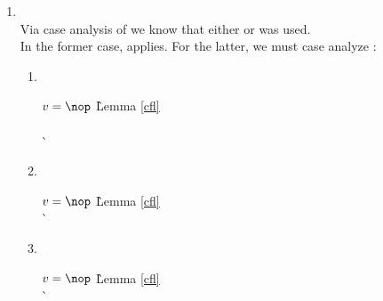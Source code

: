 \begin{enumerate}
\begin{enumerate}
  \item {} \ \\

    Via case analysis of  we know that either  or  was used. \\

    In the former case,  applies.
    For the latter, we must case analyze :\\

    \begin{enumerate}
    \item {} \ \\

      \begin{tabbing}
      $v = \nop$
        \` Lemma \ref{cfl} \\
       \\
        \`  \\
      \end{tabbing}

    \item {} \ \\
      \begin{tabbing}
      $v = \nop$
        \` Lemma \ref{cfl} \\
        \`  \\
      \end{tabbing}

    \item {} \ \\
      \begin{tabbing}
      $v = \nop$
        \` Lemma \ref{cfl} \\
        \`  \\
      \end{tabbing}


\end{enumerate}
\end{enumerate}
\end{enumerate}
